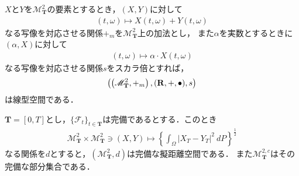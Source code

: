 	\begin{screen}
		\begin{thm}
			$X$と$Y$を$\mathscr{M}^2_{\mathbf{T}}$の要素とするとき，$(X,Y)$に対して
			\begin{align}
				(t,\omega) \longmapsto X(t,\omega) + Y(t,\omega)
			\end{align}
			なる写像を対応させる関係$+_m$を$\mathscr{M}^2_{\mathbf{T}}$上の加法とし，
			また$\alpha$を実数とするときに$(\alpha,X)$に対して
			\begin{align}
				(t,\omega) \longmapsto \alpha \cdot X(t,\omega)
			\end{align}
			なる写像を対応させる関係$s$をスカラ倍とすれば，
			\begin{align}
				\left(\left(\mathscr{M}^2_{\mathbf{T}},+_m \right),(\mathbf{R},+,\bullet),s\right)
			\end{align}
			は線型空間である．
		\end{thm}
	\end{screen}
	
	\begin{screen}
		\begin{thm}
		\label{thm:pseudo_metric_on_square_integrable_martingales}
			$\mathbf{T} = [0,T]$とし，$\{\mathscr{F}_t\}_{t \in \mathbf{T}}$は完備であるとする．このとき
			\begin{align}
				\mathscr{M}^2_{\mathbf{T}} \times \mathscr{M}^2_{\mathbf{T}} \ni (X,Y) \longmapsto
				\left\{\int_\Omega |X_T-Y_T|^2\ dP\right\}^{\frac{1}{2}}
			\end{align}
			なる関係を$d$とすると，$\left(\mathscr{M}^2_{\mathbf{T}},d\right)$は完備な擬距離空間である．
			また$\mathscr{M}^{2,c}_{\mathbf{T}}$はその完備な部分集合である．
		\end{thm}
	\end{screen}
	
